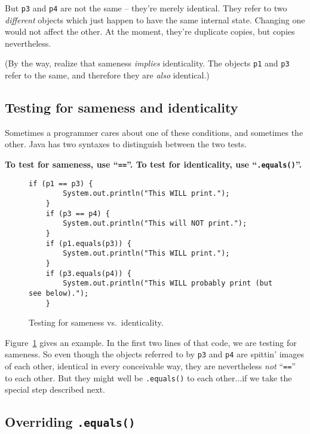 But \texttt{p3} and \texttt{p4} are not the same -- they're merely identical.
They refer to two \textit{different} objects which just happen to have the
same internal state. Changing one would not affect the other. At the moment,
they're duplicate copies, but copies nevertheless.

(By the way, realize that sameness \textit{implies} identicality. The objects
\texttt{p1} and \texttt{p3} refer to the same, and therefore they are
\textit{also} identical.)

\subsection{Testing for sameness and identicality}

Sometimes a programmer cares about one of these conditions, and sometimes the
other. Java has two syntaxes to distinguish between the two tests.

\textbf{To test for sameness, use ``\texttt{==}''. To test for identicality, use
``\texttt{.equals()}''.}

\begin{figure}
\begin{Verbatim}[fontsize=\scriptsize,samepage=true,frame=single]
    if (p1 == p3) {
        System.out.println("This WILL print.");
    }
    if (p3 == p4) {
        System.out.println("This will NOT print.");
    }
    if (p1.equals(p3)) {
        System.out.println("This WILL print.");
    }
    if (p3.equals(p4)) {
        System.out.println("This WILL probably print (but see below).");
    }
\end{Verbatim}
\caption{Testing for sameness vs.~identicality.}
\label{fig:sameness}
\end{figure}

Figure~\ref{fig:sameness} gives an example. In the first two lines of that
code, we are testing for sameness. So even though the objects referred to by
\texttt{p3} and \texttt{p4} are spittin' images of each other, identical in
every conceivable way, they are nevertheless \textit{not} ``\texttt{==}'' to
each other. But they might well be \texttt{.equals()} to each other...if we
take the special step described next.

\subsection{Overriding \texttt{.equals()}}

